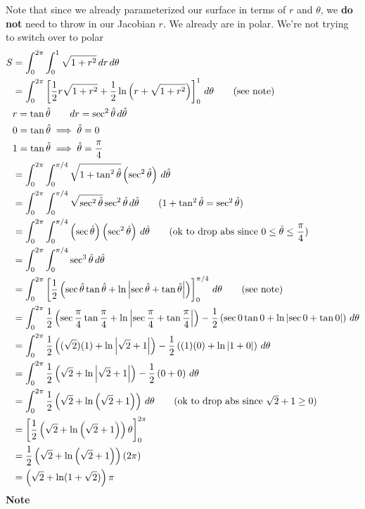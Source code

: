 \documentclass{article}
\newcommand{\lrp}[1]{\left( #1 \right)}
\newcommand{\lrb}[1]{\left[ #1 \right]}
\begin{document}
Note that since we already parameterized our surface in terms of $r$ and $\theta$, we \textbf{do not} need to throw in our Jacobian $r$. We already are in polar. We're not trying to switch over to polar
\begin{align*}
    S&=\int_0^{2\pi}\int_0^1\sqrt{{1+r^2}}\,dr\,d\theta\\
   &=\int_0^{2\pi}\lrb{\frac{1}{2}r\sqrt{1+r^2}+\frac{1}{2}\ln\lrp{r+\sqrt{1+r^2}}}_0^1\,d\theta\tag{see note}\\
   &r=\tan\hat{\theta}\hspace{2em}dr=\sec^2\hat{\theta}\,d\hat{\theta}\\
   &0=\tan\hat{\theta}\implies \hat{\theta}=0\\
   &1=\tan\hat{\theta}\implies \hat{\theta}=\frac{\pi}{4}\\
   &=\int_0^{2\pi}\int_0^{\pi/4}\sqrt{1+\tan^2 \hat{\theta}}\lrp{\sec^2 \hat{\theta}}\,d\hat{\theta}\\
   &=\int_0^{2\pi}\int_0^{\pi/4}\sqrt{\sec^2 \hat{\theta}}\sec^2\hat{\theta}\,d\hat{\theta}\tag{$1+\tan^2\hat{\theta}=\sec^2\hat{\theta}$}\\
   &=\int_0^{2\pi}\int_0^{\pi/4}\lrp{\sec \hat{\theta}}\lrp{\sec^2\hat{\theta}}\,d\hat{\theta}\tag{ok to drop abs since $0\leq \hat{\theta}\leq \dfrac{\pi}{4}$}\\
   &=\int_0^{2\pi}\int_0^{\pi/4}\sec^3\hat{\theta}\,d\hat{\theta}\\
   &=\int_0^{2\pi}\lrb{\frac{1}{2}\lrp{\sec \hat{\theta}\tan\hat{\theta}+\ln\left|\sec \hat{\theta}+\tan \hat{\theta}\right|}}_0^{\pi/4}\,d\theta\tag{see note}\\
   &=\int_0^{2\pi}\frac{1}{2}\lrp{\sec\frac{\pi}{4}\tan\frac{\pi}{4}+\ln\left|\sec\frac{\pi}{4}+\tan\frac{\pi}{4}\right|}-\frac{1}{2}\lrp{\sec 0\tan 0 +\ln\left|\sec 0 +\tan 0\right|}\,d\theta\\
   &=\int_0^{2\pi}\frac{1}{2}\lrp{(\sqrt{2})(1)+\ln\left|\sqrt{2}+1\right|}-\frac{1}{2}\lrp{(1)(0)+\ln\left|1+0\right|}\,d\theta\\
   &=\int_0^{2\pi}\frac{1}{2}\lrp{\sqrt{2}+\ln\left|\sqrt{2}+1\right|}-\frac{1}{2}\lrp{0+0}\,d\theta\\
   &=\int_0^{2\pi}\frac{1}{2}\lrp{\sqrt{2}+\ln\lrp{\sqrt{2}+1}}\,d\theta\tag{ok to drop abs since $\sqrt{2}+1\geq 0$}\\
   &=\lrb{\frac{1}{2}\lrp{\sqrt{2}+\ln\lrp{\sqrt{2}+1}}\theta}_0^{2\pi}\\
   &=\frac{1}{2}\lrp{\sqrt{2}+\ln\lrp{\sqrt{2}+1}}\lrp{2\pi}\\
   &=\lrp{\sqrt{2}+\ln(1+\sqrt{2})}\pi
\end{align*}
\textbf{Note}
\end{document}
